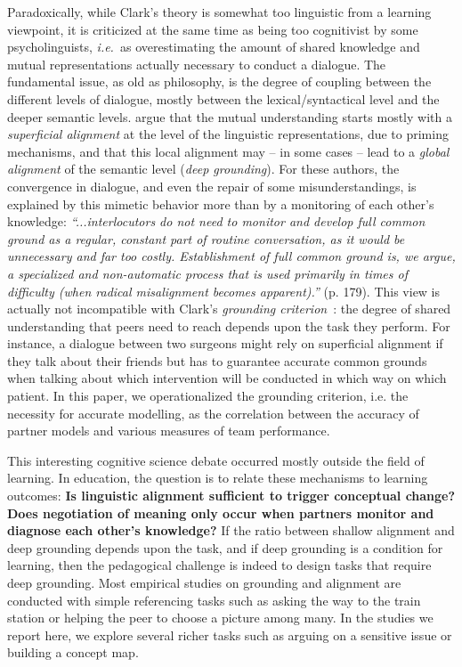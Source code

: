 \documentclass[natbib]{svjour3}
\newcommand{\ie}{{\textit{i.e.\ }}}
\begin{document}
Paradoxically, while Clark's theory is somewhat too linguistic from a learning  viewpoint, it is criticized at the same time as being too cognitivist by
some psycholinguists, \ie as overestimating the amount of shared knowledge and
mutual representations actually necessary to conduct a dialogue. The fundamental
issue, as old as philosophy, is the degree of coupling between the different
levels of dialogue, mostly between the lexical/syntactical level and the deeper
semantic levels. \citet{pickering2006alignment} argue that the mutual
understanding starts mostly with a \emph{superficial alignment} at the level of
the linguistic representations, due to priming mechanisms, and that this local
alignment may -- in some cases -- lead to a \emph{global alignment} of the
semantic level (\emph{deep grounding}).  For these authors, the convergence in
dialogue, and even the repair of some misunderstandings, is explained by this
mimetic behavior more than by a monitoring of each other's knowledge:
\emph{``...interlocutors do not need to monitor and develop full common ground
as a regular, constant part of routine conversation, as it would be
unnecessary and far too costly. Establishment of full common ground is, we
argue, a specialized and non-automatic process that is used primarily in
times of difficulty (when radical misalignment becomes apparent).''} (p. 179).
This view is actually not incompatible with Clark's \emph{grounding
criterion}~\citep{clark1989contributing}: the degree of shared understanding that
peers need to reach depends upon the task they perform. For instance, a dialogue
between two surgeons might rely on superficial alignment if they talk about
their friends but has to guarantee accurate common grounds when talking about
which intervention will be conducted in which way on which patient.  In this paper, we operationalized the grounding criterion, i.e. the necessity for accurate modelling, as the correlation between the accuracy of partner models and various measures of team performance.


This interesting cognitive science debate occurred mostly outside the field of
learning. In education, the question is to relate these mechanisms to learning
outcomes: \textbf{Is linguistic alignment sufficient to trigger conceptual
change?} \textbf{Does negotiation of meaning only occur when partners monitor
and diagnose each other's knowledge?} If the ratio between shallow alignment and
deep grounding depends upon the task, and if deep grounding is a condition for
learning, then the pedagogical challenge is indeed to design tasks that require
deep grounding. Most empirical studies on grounding and alignment are conducted
with simple referencing tasks such as asking the way to the train station
or helping the peer to choose a picture among many. In the studies we report here, we
explore several richer tasks such as arguing on a sensitive issue or building a
concept map.  
\end{document}
